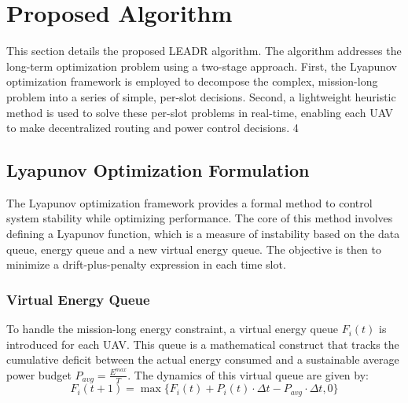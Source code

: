 \documentclass[runningheads]{llncs}
\begin{document}
\section{Proposed Algorithm}
\label{s4}
This section details the proposed LEADR algorithm. The algorithm addresses the long-term optimization problem using a two-stage approach. First, the Lyapunov optimization framework is employed to decompose the complex, mission-long problem into a series of simple, per-slot decisions. Second, a lightweight heuristic method is used to solve these per-slot problems in real-time, enabling each UAV to make decentralized routing and power control decisions.
4\subsection{Lyapunov Optimization Formulation} 
The Lyapunov optimization framework provides a formal method to control system stability while optimizing performance. The core of this method involves defining a Lyapunov function, which is a measure of instability based on the data queue, energy queue and a new virtual energy queue. The objective is then to minimize a drift-plus-penalty expression in each time slot.
\subsubsection{Virtual Energy Queue}
To handle the mission-long energy constraint, a virtual energy queue $F_i(t)$ is introduced for each UAV. This queue is a mathematical construct that tracks the cumulative deficit between the actual energy consumed and a sustainable average power budget $P_{avg}=\frac{E^{max}}{T}$. The dynamics of this virtual queue are given by:
\begin{equation}
    F_{i}(t+1)=\max\{F_{i}(t)+P_{i}(t)\cdot\Delta t-P_{avg}\cdot\Delta t,0\}
\end{equation}
\end{document}
